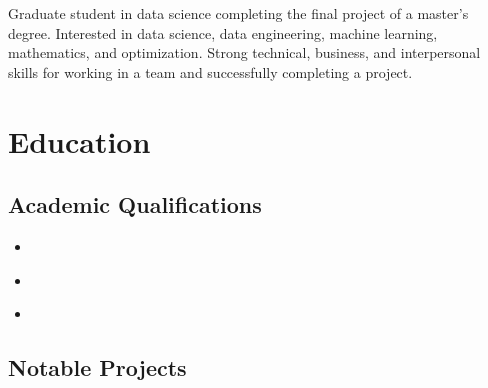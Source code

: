 \documentclass[11pt,a4paper,sans]{moderncv}        %
\begin{document}
\makecvtitle

\small{Graduate student in data science completing the final project of a master's degree. Interested in data science, data engineering, machine learning, mathematics, and optimization. Strong technical, business, and interpersonal skills for working in a team and successfully completing a project.}

\section{Education}

\vspace{5pt}

\subsection{Academic Qualifications}

\vspace{5pt}

\begin{itemize}

\item{}

\item{%
}  %

\item{}

\end{itemize}

\vspace{2pt}

\subsection{Notable Projects}

\vspace{5pt}
\end{document}
